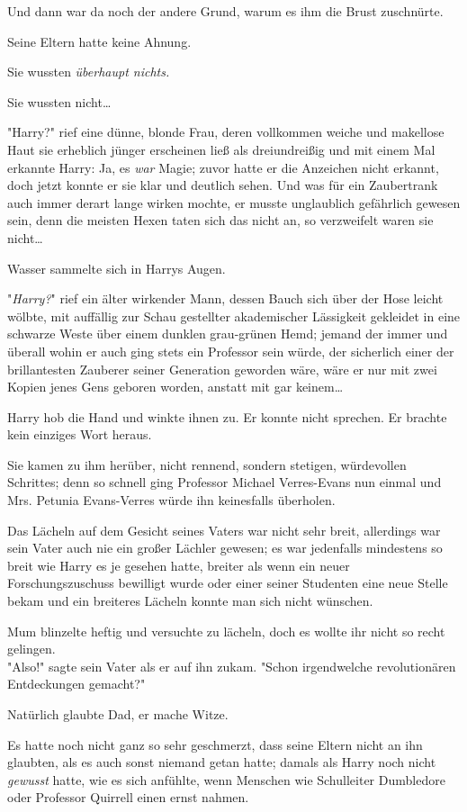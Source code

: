 {Und dann war da noch der andere Grund, warum es ihm die Brust zuschnürte.

Seine Eltern hatte keine Ahnung.

Sie wussten \emph{überhaupt nichts.}

Sie wussten nicht…

"Harry?" rief eine dünne, blonde Frau, deren vollkommen weiche und makellose Haut sie erheblich jünger erscheinen ließ als dreiundreißig und mit einem Mal erkannte Harry: Ja, es \emph{war} Magie; zuvor hatte er die Anzeichen nicht erkannt, doch jetzt konnte er sie klar und deutlich sehen. Und was für ein Zaubertrank auch immer derart lange wirken mochte, er musste unglaublich gefährlich gewesen sein, denn die meisten Hexen taten sich das nicht an, so verzweifelt waren sie nicht…

Wasser sammelte sich in Harrys Augen.

"\emph{Harry?}" rief ein älter wirkender Mann, dessen Bauch sich über der Hose leicht wölbte, mit auffällig zur Schau gestellter akademischer Lässigkeit gekleidet in eine schwarze Weste über einem dunklen grau-grünen Hemd; jemand der immer und überall wohin er auch ging stets ein Professor sein würde, der sicherlich einer der brillantesten Zauberer seiner Generation geworden wäre, wäre er nur mit zwei Kopien jenes Gens geboren worden, anstatt mit gar keinem…

Harry hob die Hand und winkte ihnen zu. Er konnte nicht sprechen. Er brachte kein einziges Wort heraus.

Sie kamen zu ihm herüber, nicht rennend, sondern stetigen, würdevollen Schrittes; denn so schnell ging Professor Michael Verres-Evans nun einmal und Mrs. Petunia Evans-Verres würde ihn keinesfalls überholen.

Das Lächeln auf dem Gesicht seines Vaters war nicht sehr breit, allerdings war sein Vater auch nie ein großer Lächler gewesen; es war jedenfalls mindestens so breit wie Harry es je gesehen hatte, breiter als wenn ein neuer Forschungszuschuss bewilligt wurde oder einer seiner Studenten eine neue Stelle bekam und ein breiteres Lächeln konnte man sich nicht wünschen.

Mum blinzelte heftig und versuchte zu lächeln, doch es wollte ihr nicht so recht gelingen.\\ "Also!" sagte sein Vater als er auf ihn zukam. "Schon irgendwelche revolutionären Entdeckungen gemacht?"

Natürlich glaubte Dad, er mache Witze.

Es hatte noch nicht ganz so sehr geschmerzt, dass seine Eltern nicht an ihn glaubten, als es auch sonst niemand getan hatte; damals als Harry noch nicht \emph{gewusst} hatte, wie es sich anfühlte, wenn Menschen wie Schulleiter Dumbledore oder Professor Quirrell einen ernst nahmen.

}
